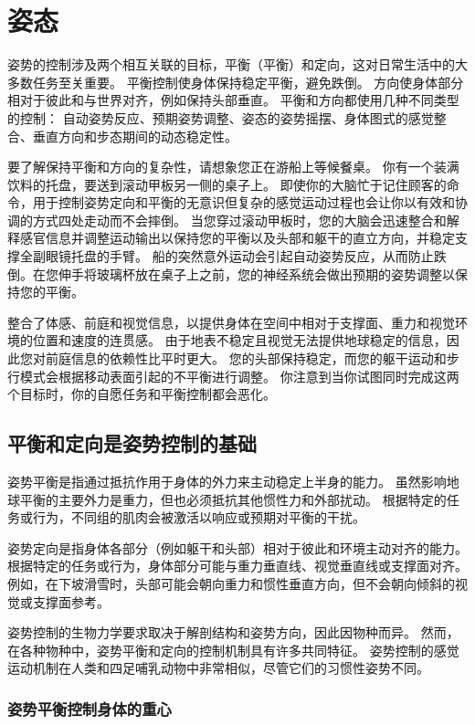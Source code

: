\chapter{姿态} \label{chap:chap36}
姿势的控制涉及两个相互关联的目标，平衡（平衡）和定向，这对日常生活中的大多数任务至关重要。
平衡控制使身体保持稳定平衡，避免跌倒。
方向使身体部分相对于彼此和与世界对齐，例如保持头部垂直。
平衡和方向都使用几种不同类型的控制：
自动姿势反应、预期姿势调整、姿态的姿势摇摆、身体图式的感觉整合、垂直方向和步态期间的动态稳定性。


要了解保持平衡和方向的复杂性，请想象您正在游船上等候餐桌。
你有一个装满饮料的托盘，要送到滚动甲板另一侧的桌子上。
即使你的大脑忙于记住顾客的命令，用于控制姿势定向和平衡的无意识但复杂的感觉运动过程也会让你以有效和协调的方式四处走动而不会摔倒。
当您穿过滚动甲板时，您的大脑会迅速整合和解释感官信息并调整运动输出以保持您的平衡以及头部和躯干的直立方向，并稳定支撑全副眼镜托盘的手臂。
船的突然意外运动会引起自动姿势反应，从而防止跌倒。在您伸手将玻璃杯放在桌子上之前，您的神经系统会做出预期的姿势调整以保持您的平衡。


整合了体感、前庭和视觉信息，以提供身体在空间中相对于支撑面、重力和视觉环境的位置和速度的连贯感。
由于地表不稳定且视觉无法提供地球稳定的信息，因此您对前庭信息的依赖性比平时更大。
您的头部保持稳定，而您的躯干运动和步行模式会根据移动表面引起的不平衡进行调整。
你注意到当你试图同时完成这两个目标时，你的自愿任务和平衡控制都会恶化。


\section{平衡和定向是姿势控制的基础}

姿势平衡是指通过抵抗作用于身体的外力来主动稳定上半身的能力。
虽然影响地球平衡的主要外力是重力，但也必须抵抗其他惯性力和外部扰动。
根据特定的任务或行为，不同组的肌肉会被激活以响应或预期对平衡的干扰。


姿势定向是指身体各部分（例如躯干和头部）相对于彼此和环境主动对齐的能力。
根据特定的任务或行为，身体部分可能与重力垂直线、视觉垂直线或支撑面对齐。
例如，在下坡滑雪时，头部可能会朝向重力和惯性垂直方向，但不会朝向倾斜的视觉或支撑面参考。


姿势控制的生物力学要求取决于解剖结构和姿势方向，因此因物种而异。
然而，在各种物种中，姿势平衡和定向的控制机制具有许多共同特征。
姿势控制的感觉运动机制在人类和四足哺乳动物中非常相似，尽管它们的习惯性姿势不同。



\subsection{姿势平衡控制身体的重心}

